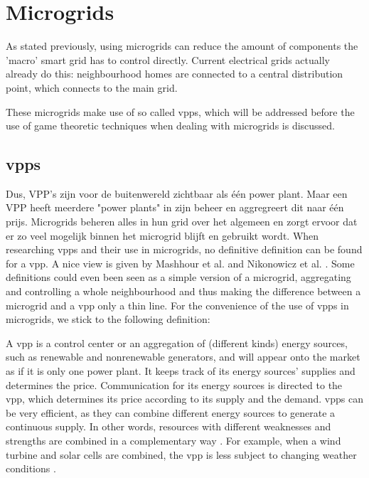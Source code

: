 \section{Microgrids}
As stated previously, using microgrids can reduce the amount of components the 'macro' smart grid has to control directly. Current electrical grids actually already do this: neighbourhood homes are connected to a central distribution point, which connects to the main grid.

These microgrids make use of so called \acp{vpp}, which will be addressed before the use of game theoretic techniques when dealing with microgrids is discussed.

\subsection{\aclp{vpp}}
Dus, VPP's zijn voor de buitenwereld zichtbaar als één power plant. Maar een VPP heeft meerdere "power plants" in zijn beheer en aggregreert dit naar één prijs. Microgrids beheren alles in hun grid over het algemeen en zorgt ervoor dat er zo veel mogelijk binnen het microgrid blijft en gebruikt wordt.
When researching \acp{vpp} and their use in microgrids, no definitive definition can be found for a \ac{vpp}. A nice view is given by Mashhour et al. \cite{MashhourMoghaddas-Tafreshi2011} and Nikonowicz et al. \cite{NikonowiczMilewski2012}. Some definitions could even been seen as a simple version of a microgrid, aggregating and controlling a whole neighbourhood \cite{Kumagai2012} and thus making the difference between a microgrid and a \ac{vpp} only a thin line. For the convenience of the use of \acp{vpp} in microgrids, we stick to the following definition:

A \ac{vpp} is a control center or an aggregation of (different kinds) energy sources, such as renewable and nonrenewable generators, and will appear onto the market as if it is only one power plant. It keeps track of its energy sources' supplies and determines the price. Communication for its energy sources is directed to the \ac{vpp}, which determines its price according to its supply and the demand. \acp{vpp} can be very efficient, as they can combine different energy sources to generate a continuous supply. In other words, resources with different weaknesses and strengths are combined in a complementary way \cite{Koeppel2003}. For example, when a wind turbine and solar cells are combined, the \ac{vpp} is less subject to changing weather conditions \cite{Tromly2001, Kumagai2012, MashhourMoghaddas-Tafreshi2011, NikonowiczMilewski2012}. 

